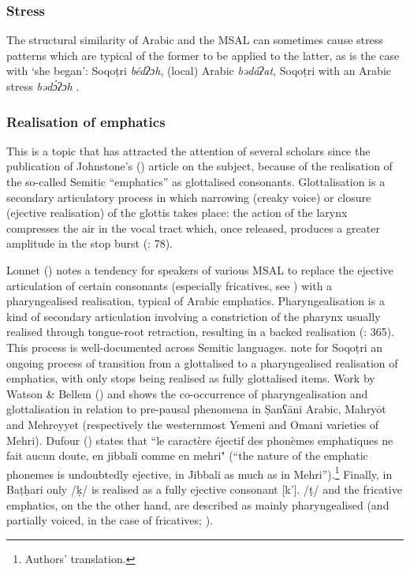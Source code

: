 \documentclass[output=paper]{langsci/langscibook}
\begin{document}
 \subsubsection{Stress}

The structural similarity of Arabic and the MSAL can sometimes cause stress patterns which are typical of the former to be applied to the latter, as is the case with `she began': Soqoṭri \textit{bédʔɔh}, (local) Arabic \textit{bədáʔat}, Soqoṭri with an Arabic stress \textit{bədɔ́ʔɔh} \citep[299]{Lonnet2011}.


 \subsubsection{Realisation of emphatics}\label{sec:key:emph}

This is a topic that has attracted the attention of several scholars since the publication of Johnstone’s (\citeyear{Johnstone1975}) article on the subject, because of the realisation of the so-called Semitic “emphatics” as glottalised consonants. Glottalisation is a secondary articulatory process in which narrowing (creaky voice) or closure (ejective realisation) of the glottis takes place: the action of the larynx compresses the air in the vocal tract which, once released, produces a greater amplitude in the stop burst (\citealt{LadefogedMaddieson1996}: 78). 

Lonnet (\citeyear[299]{Lonnet2011}) notes a tendency for speakers of various MSAL to replace the ejective articulation of certain consonants (especially fricatives, see \citealt{RidouaneGendrot2017}) with a pharyngealised realisation, typical of Arabic emphatics. Pharyngealisation is a kind of secondary articulation involving a constriction of the pharynx usually realised through tongue-root retraction, resulting in a backed realisation (\citealt{LadefogedMaddieson1996}: 365). This process is well-documented across Semitic languages. \citet{NaumkinPorkhomovsky1981} note for Soqoṭri an ongoing process of transition from a glottalised to a pharyngealised realisation of emphatics, with only stops being realised as fully glottalised items. Work by Watson \& Bellem (\citeyear{WatsonBellem2010,WatsonBellem2011}) and \citet{WatsonHeselwood2016} shows the co-occurrence of pharyngealisation and glottalisation in relation to pre-pausal phenomena in \d{S}anʕāni Arabic, Mahryōt and Mehreyyet (respectively the westernmost Yemeni and Omani varieties of Mehri). Dufour (\citeyear[22]{Dufour2016}) states that ``le caractère éjectif des phonèmes emphatiques ne fait aucun doute, en jibbali comme en mehri" (“the nature of the emphatic phonemes is undoubtedly ejective, in Jibbali as much as in Mehri”).\footnote{Authors' translation.} Finally, in Baṭḥari only /ḳ/ is realised as a fully ejective consonant [k’]. /ṭ/ and the fricative emphatics, on the the other hand, are described as mainly pharyngealised (and partially voiced, in the case of fricatives; \citealt{Gasparini2017}).
\end{document}
